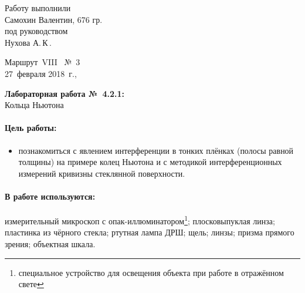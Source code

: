 \documentclass[12pt]{article}
\begin{document}
	\begin{minipage}{0.45\linewidth}
	Работу выполнили\\
	Самохин Валентин, 676 гр.\\[2mm]
	под руководством\\
	Нухова А.\,К\,.
	\end{minipage}
	\hfill
	\begin{minipage}{0.45\linewidth}\flushright
		Маршрут~VIII \ №~3\\[3mm]
		27~февраля 2018~г.,\\
		\end{minipage}
		
		\vspace{8mm}
		\begin{center}
			\textbf{\Large Лабораторная работа №~4.2.1:}\\[\parskip]
			\LARGE Кольца Ньютона
			\end{center}
			\vspace{0mm}
			\paragraph{Цель работы:}
			\begin{itemize}
				\item познакомиться с явлением интерференции в тонких
				плёнках (полосы равной толщины) на примере колец Ньютона и с
				методикой интерференционных измерений кривизны стеклянной поверхности.
			\end{itemize}
			
			\paragraph{В работе используются:}
			измерительный микроскоп с опак-иллюминатором\footnote{специальное устройство
				для освещения объекта при работе в отражённом свете}; плосковыпуклая линза; пластинка из чёрного стекла;
			ртутная лампа ДРШ; щель; линзы; призма прямого зрения; объектная шкала.
			
			
			\vspace{2\parskip}
\end{document}

